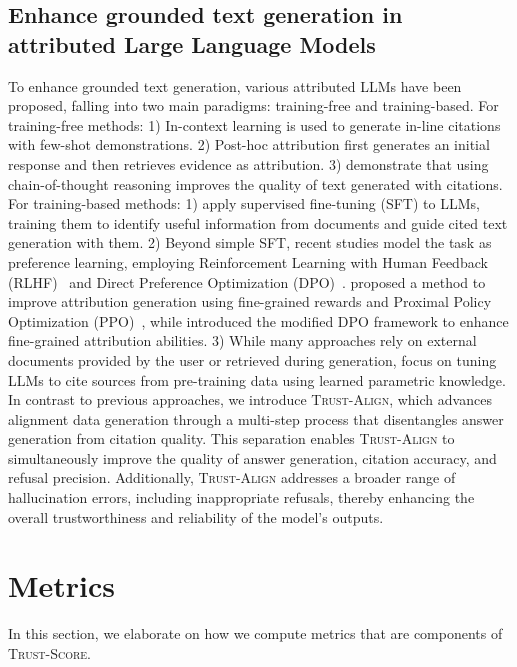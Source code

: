 \documentclass{article} %
\renewcommand{\cite}[1]{\citep{#1}}
\newcommand{\method}[0]{\textsc{Trust-Align}}
\newcommand{\metric}[0]{\textsc{Trust-Score}}
\begin{document}
\subsection{Enhance grounded text generation in attributed Large Language Models}
To enhance grounded text generation, various attributed LLMs have been proposed, falling into two main paradigms: training-free and training-based. For training-free methods: 
1) In-context learning \cite{gao2023enabling} is used to generate in-line citations with few-shot demonstrations. 
2) Post-hoc attribution \cite{gao-etal-2023-rarr, li2024citationenhanced} first generates an initial response and then retrieves evidence as attribution. 
3) \citet{Ji_Liu_Du_Ng_2024} demonstrate that using chain-of-thought reasoning improves the quality of text generated with citations.
For training-based methods: 
1) \citet{asai2024selfrag, slobodkin2024attribute, xia2024groundsentenceimprovingretrievalaugmented, ye2024effective} apply supervised fine-tuning (SFT) to LLMs, training them to identify useful information from documents and guide cited text generation with them. 
2) Beyond simple SFT, recent studies model the task as preference learning, employing Reinforcement Learning with Human Feedback (RLHF)~\cite{ouyang2022traininglanguagemodelsfollow} and Direct Preference Optimization (DPO)~\cite{rafailov2024directpreferenceoptimizationlanguage}. \citet{huang2024training} proposed a method to improve attribution generation using fine-grained rewards and Proximal Policy Optimization (PPO)~\cite{schulman2017proximalpolicyoptimizationalgorithms}, while \citet{li2024improving, huang-etal-2024-learning} introduced the modified DPO framework to enhance fine-grained attribution abilities.
3) While many approaches rely on external documents provided by the user or retrieved during generation, \citet{khalifa2024sourceaware, zhang2024verifiable} focus on tuning LLMs to cite sources from pre-training data using learned parametric knowledge. In contrast to previous approaches, we introduce \method{}, which advances alignment data generation through a multi-step process that disentangles answer generation from citation quality. This separation enables \method{} to simultaneously improve the quality of answer generation, citation accuracy, and refusal precision. Additionally, \method{} addresses a broader range of hallucination errors, including inappropriate refusals, thereby enhancing the overall trustworthiness and reliability of the model’s outputs.


\section{Metrics} \label{sec:metrics_app}
In this section, we elaborate on how we compute metrics that are components of \metric{}.
\end{document}
